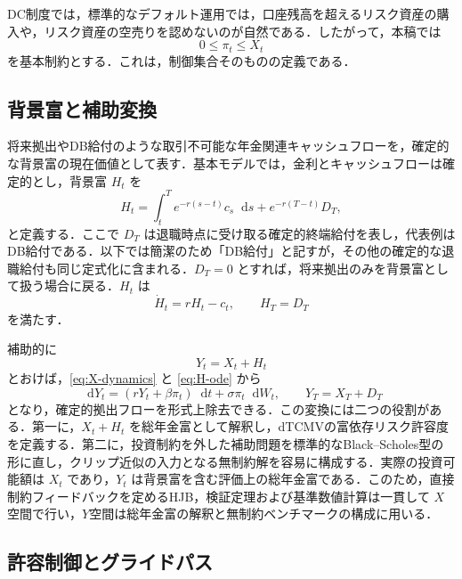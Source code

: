 \documentclass[10pt,a4paper]{article}
\theoremstyle{plain}
\theoremstyle{definition}
\newcommand{\dd}{\mathop{}\!\mathrm{d}}
\begin{document}
DC制度では，標準的なデフォルト運用では，口座残高を超えるリスク資産の購入や，リスク資産の空売りを認めないのが自然である．したがって，本稿では
\begin{equation}
  0\leq\pi_t\leq X_t
  \label{eq:dc-constraint-x}
\end{equation}
を基本制約とする．これは，制御集合そのものの定義である．

\subsection{背景富と補助変換}

将来拠出やDB給付のような取引不可能な年金関連キャッシュフローを，確定的な背景富の現在価値として表す．基本モデルでは，金利とキャッシュフローは確定的とし，背景富 $H_t$ を
\begin{equation}
  H_t=\int_t^T e^{-r(s-t)}c_s\dd s+e^{-r(T-t)}D_T,
  \label{eq:H-def}
\end{equation}
と定義する．ここで $D_T$ は退職時点に受け取る確定的終端給付を表し，代表例はDB給付である．以下では簡潔のため「DB給付」と記すが，その他の確定的な退職給付も同じ定式化に含まれる．$D_T=0$ とすれば，将来拠出のみを背景富として扱う場合に戻る．$H_t$ は
\begin{equation}
  \dot H_t=rH_t-c_t,
  \qquad H_T=D_T
  \label{eq:H-ode}
\end{equation}
を満たす．

補助的に
\begin{equation}
  Y_t=X_t+H_t
  \label{eq:Y-def}
\end{equation}
とおけば，\eqref{eq:X-dynamics} と \eqref{eq:H-ode} から
\begin{equation}
  \dd Y_t=(rY_t+\beta\pi_t)\dd t+\sigma\pi_t\dd W_t,
  \qquad Y_T=X_T+D_T
  \label{eq:Y-dynamics}
\end{equation}
となり，確定的拠出フローを形式上除去できる．この変換には二つの役割がある．第一に，$X_t+H_t$ を総年金富として解釈し，dTCMVの富依存リスク許容度を定義する．第二に，投資制約を外した補助問題を標準的なBlack--Scholes型の形に直し，クリップ近似の入力となる無制約解を容易に構成する．実際の投資可能額は $X_t$ であり，$Y_t$ は背景富を含む評価上の総年金富である．このため，直接制約フィードバックを定めるHJB，検証定理および基準数値計算は一貫して $X$空間で行い，$Y$空間は総年金富の解釈と無制約ベンチマークの構成に用いる．

\subsection{許容制御とグライドパス}
\label{sec:admissible-glide}
\end{document}
